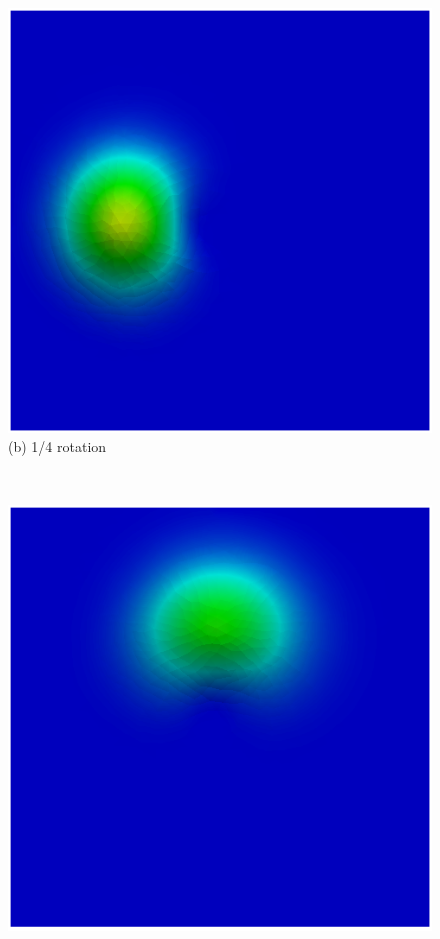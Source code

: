\begin{figure}[H]
\begin{minipage}{.5\linewidth}
      \includegraphics[scale=0.42]{./02_chaps/cap_validation/figure/figSLlinear1.png}\\
      (b) 1/4 rotation
     \end{minipage}\\[10pt]
     \begin{minipage}{.5\linewidth}
      \centering
      \includegraphics[scale=0.42]{./02_chaps/cap_validation/figure/figSLlinear2.png}\\

\end{minipage}
\end{figure}
